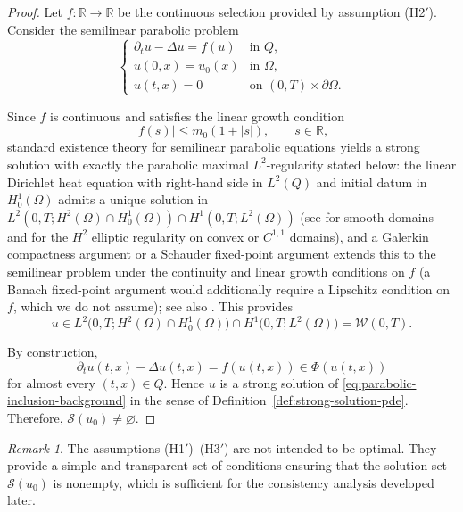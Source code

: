 \documentclass[11pt]{elsarticle}
\theoremstyle{definition}
\theoremstyle{remark}
\newtheorem{remark}[theorem]{Remark}
\numberwithin{equation}{section}
\begin{document}
\begin{proof}
	Let $f:\mathbb{R}\to\mathbb{R}$ be the continuous selection provided
	by assumption \textup{(H2$'$)}. Consider the semilinear parabolic
	problem
	\[
	\begin{cases}
		\partial_t u-\Delta u=f(u)
		& \text{in } Q,
		\\
		u(0,x)=u_0(x)
		& \text{in } \Omega,
		\\
		u(t,x)=0
		& \text{on } (0,T)\times\partial\Omega.
	\end{cases}
	\]
	
	Since $f$ is continuous and satisfies the linear growth condition
	\[
	|f(s)|\le m_0(1+|s|),
	\qquad s\in\mathbb{R},
	\]
	standard existence theory for semilinear parabolic equations yields a
	strong solution with exactly the parabolic maximal $L^2$-regularity
	stated below: the linear Dirichlet heat equation with right-hand side in
	$L^2(Q)$ and initial datum in $H_0^1(\Omega)$ admits a unique solution in
	$L^2(0,T;H^2(\Omega)\cap H_0^1(\Omega))\cap H^1(0,T;L^2(\Omega))$
	(see \cite[Section~7.1.3, Theorem~5]{Evans} for smooth domains and
	\cite[Theorem~3.2.1.2]{Grisvard1985} for the $H^2$ elliptic regularity on
	convex or $C^{1,1}$ domains), and a Galerkin compactness argument or a
	Schauder fixed-point argument extends this to the semilinear problem
	under the continuity and linear growth conditions on $f$ (a Banach
	fixed-point argument would additionally require a Lipschitz condition
	on $f$, which we do not assume); see also
	\cite[Chapter~4]{LionsMagenes}. This
	provides
	\[
	u\in
	L^2\!\bigl(0,T;H^2(\Omega)\cap H_0^1(\Omega)\bigr)
	\cap
	H^1\!\bigl(0,T;L^2(\Omega)\bigr)
	=
	\mathcal{W}(0,T).
	\]
	
	By construction,
	\[
	\partial_t u(t,x)-\Delta u(t,x)
	=
	f(u(t,x))
	\in
	\Phi(u(t,x))
	\]
	for almost every $(t,x)\in Q$.
	Hence $u$ is a strong solution of
	\eqref{eq:parabolic-inclusion-background}
	in the sense of Definition~\ref{def:strong-solution-pde}.
	Therefore,
	$\mathcal{S}(u_0)\neq\varnothing$.
\end{proof}

\begin{remark}
	The assumptions \textup{(H1$'$)--(H3$'$)} are not intended to be optimal.
	They provide a simple and transparent set of conditions ensuring that the
	solution set $\mathcal{S}(u_0)$ is nonempty, which is sufficient for the
	consistency analysis developed later.
\end{remark}

\end{document}
